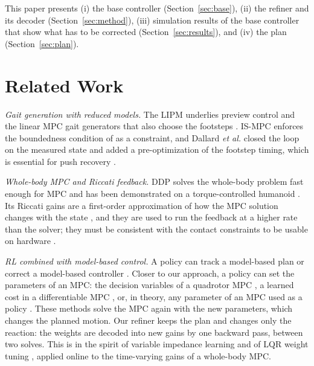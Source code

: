 \documentclass[conference]{IEEEtran}
\begin{document}
This paper presents (i) the base controller (Section~\ref{sec:base}), (ii) the refiner and its decoder (Section~\ref{sec:method}), (iii) simulation results of the base controller that show what has to be corrected (Section~\ref{sec:results}), and (iv) the plan (Section~\ref{sec:plan}).

\section{Related Work}

\emph{Gait generation with reduced models.}
The LIPM underlies preview control \cite{kajita2003preview} and the linear MPC gait generators that also choose the footsteps \cite{wieber2006mpc,herdt2010online}.
IS-MPC \cite{scianca2020ismpc} enforces the boundedness condition of \cite{lanari2014boundedness} as a constraint, and Dallard \emph{et al.} \cite{dallard2025adios} closed the loop on the measured state and added a pre-optimization of the footstep timing, which is essential for push recovery \cite{khadiv2020timing}.

\emph{Whole-body MPC and Riccati feedback.}
DDP \cite{mayne1966ddp,tassa2012synthesis} solves the whole-body problem fast enough for MPC and has been demonstrated on a torque-controlled humanoid \cite{dantec2022wbmpc}.
Its Riccati gains are a first-order approximation of how the MPC solution changes with the state \cite{dantec2022firstorder}, and they are used to run the feedback at a higher rate than the solver; they must be consistent with the contact constraints to be usable on hardware \cite{grandia2019feedback}.

\emph{RL combined with model-based control.}
A policy can track a model-based plan \cite{jenelten2024dtc,kang2023rlmodel} or correct a model-based controller \cite{cheng2025rambo,jeon2025residualmpc}.
Closer to our approach, a policy can set the parameters of an MPC: the decision variables of a quadrotor MPC \cite{song2022policysearch}, a learned cost in a differentiable MPC \cite{amos2018diffmpc,romero2024acmpc}, or, in theory, any parameter of an MPC used as a policy \cite{gros2020nmpcrl}.
These methods solve the MPC again with the new parameters, which changes the planned motion.
Our refiner keeps the plan and changes only the reaction: the weights are decoded into new gains by one backward pass, between two solves.
This is in the spirit of variable impedance learning \cite{buchli2011variable} and of LQR weight tuning \cite{marco2016lqr}, applied online to the time-varying gains of a whole-body MPC.
\end{document}
